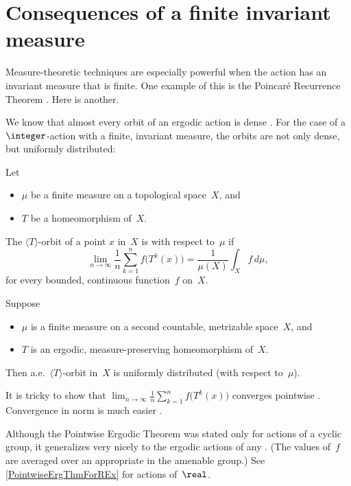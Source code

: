 \section{Consequences of a finite invariant measure}

Measure-theoretic techniques are especially powerful when the action has an invariant  measure that is finite. One example of this is the Poincar\'e Recurrence Theorem . Here is another.

We know that almost every orbit of an ergodic action is dense .
For the case of a $\integer$-action with a finite, invariant measure, the orbits are not only dense, but uniformly distributed:

\begin{defn}
Let 
	\begin{itemize}
	\item $\mu$ be a finite measure on a topological space~$X$,
	and
	\item $T$ be a homeomorphism of~$X$. 
	\end{itemize}
The $\langle T \rangle$-orbit of a point $x$ in~$X$ is  with respect to~$\mu$ if
	$$ \lim_{n \to \infty} \frac{1}{n} \sum_{k=1}^n f \bigl( T^k(x) \bigr) 
	= \frac{1}{\mu(X)} \int_X f \, d\mu ,$$
for every bounded, continuous function~$f$ on~$X$.
\end{defn}

\begin{thm} 
\label{PointwiseErgThm}
Suppose 
	\begin{itemize}
	\item $\mu$ is a finite measure on a second countable, metrizable space~$X$,
	and
	\item $T$ is an ergodic, measure-preserving homeomorphism of~$X$.
	\end{itemize}
Then a.e.\ $\langle T \rangle$-orbit in~$X$ is uniformly distributed\/ \textup(with respect to~$\mu$\textup).
\end{thm}

It is tricky to show that $\lim_{n \to \infty} \frac{1}{n} \sum_{k=1}^n f \bigl( T^k(x) \bigr)$ converges %
pointwise .
Convergence in norm is much easier . 

\begin{rem} \label{PtwiseErgAmenRem}
Although the Pointwise Ergodic Theorem was stated only for actions of a cyclic group, it generalizes very nicely to the ergodic actions of any . (The values of~$f$ are averaged over an appropriate  in the amenable group.) See \cref{PointwiseErgThmForREx} for actions of~$\real$.
\end{rem}


